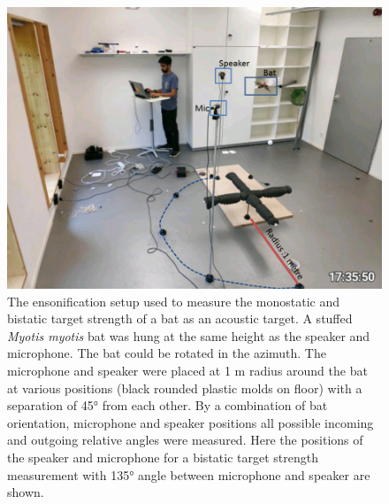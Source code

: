 \documentclass[
]{book}
\begin{document}
\begin{figure}
\includegraphics[]{original_papers/CPN_figures/Figures_SI/Figure_S4.png}
\centering
\caption{The ensonification setup used to measure the monostatic and bistatic target strength of a bat as an acoustic target. A stuffed \textit{Myotis myotis} bat was hung at the same height as the speaker and microphone. The bat could be rotated in the azimuth. The microphone and speaker were placed at 1 m radius around the bat at various positions (black rounded plastic molds on floor) with a separation of 45° from each other. By a combination of bat orientation, microphone and speaker positions all possible incoming and outgoing relative angles were measured. Here the positions of the speaker and microphone for a bistatic target strength measurement with 135° angle between microphone and speaker are shown.}
\label{cpn_figS4}
\end{figure}

\newpage
\end{document}
